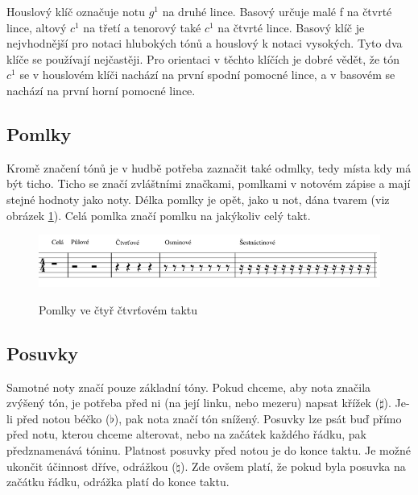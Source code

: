 Houslový klíč označuje notu $g^1$ na druhé lince.
Basový určuje malé f na čtvrté lince, altový $c^1$ na třetí a tenorový také $c^1$ na čtvrté lince.
Basový klíč je nejvhodnější pro notaci hlubokých tónů a houslový k notaci vysokých.
Tyto dva klíče se používají nejčastěji. 
Pro orientaci v těchto klíčích je dobré vědět, že
tón $c^1$ se v houslovém klíči nachází na první spodní pomocné lince, 
a v basovém se nachází na první horní pomocné lince.
\cite{cmiral,zenkl}
\par

\subsection*{Pomlky}
Kromě značení tónů je v hudbě potřeba zaznačit také odmlky, tedy místa kdy má být ticho.
Ticho se značí zvláštními značkami, pomlkami v notovém zápise a mají stejné hodnoty jako noty.
Délka pomlky je opět, jako u not, dána tvarem (viz obrázek \ref{obrazekPomlky}).
Celá pomlka značí pomlku na jakýkoliv celý takt.
\cite{cmiral,zenkl}

\begin{figure}[h]\centering
    \centering
    \includegraphics[width=0.8\linewidth]{obrazky/pomlky.png}\\[1pt]  
    \caption{Pomlky ve čtyř čtvrťovém taktu}    
    \label{obrazekPomlky}
\end{figure}


\subsection*{Posuvky}
\label{kapitolaPosuvky}
Samotné noty značí pouze základní tóny.
Pokud chceme, aby nota značila zvýšený tón, je potřeba před ni (na její linku, nebo mezeru) napsat křížek ($\sharp $).
Je-li před notou béčko ($\flat $), pak nota značí tón snížený.
Posuvky lze psát buď přímo před notu, kterou chceme alterovat, nebo na začátek každého řádku, pak předznamenává tóninu.
Platnost posuvky před notou je do konce taktu.
Je možné ukončit účinnost dříve, odrážkou ($\natural $).
Zde ovšem platí, že pokud byla posuvka na začátku řádku, odrážka platí do konce taktu.
\cite{cmiral,zenkl}

